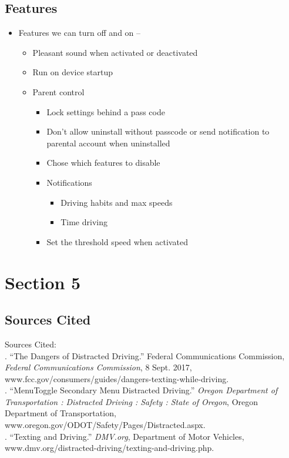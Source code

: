 \documentclass[12pt]{article}
\begin{document}
	\subsection{Features}
	\begin{itemize}
	\item Features we can turn off and on – 
		\begin{itemize}
			\item{Pleasant sound when activated or deactivated}
			\item{Run on device startup}
			\item{Parent control}
			\begin{itemize}
				\item{Lock settings behind a pass code}
				\item{Don’t allow uninstall without passcode or send notification to parental account when uninstalled}
				\item{Chose which features to disable}
				\item{Notifications}
				\begin{itemize}
					\item{Driving habits and max speeds}
					\item{Time driving}
				\end{itemize}
				\item{Set the threshold speed when activated}
			\end{itemize}
		\end{itemize}

\end{itemize}
\section{Section 5}
	\subsection{Sources Cited}

Sources Cited:\\
.	“The Dangers of Distracted Driving.” Federal Communications Commission,\textit{ Federal Communications Commission}, 8 Sept. 2017, www.fcc.gov/consumers/guides/dangers-texting-while-driving.\\
.	“MenuToggle Secondary Menu  Distracted Driving.” \textit{Oregon Department of Transportation : Distracted Driving : Safety : State of Oregon}, Oregon Department of Transportation, www.oregon.gov/ODOT/Safety/Pages/Distracted.aspx.\\
.	“Texting and Driving.” \textit{DMV.org}, Department of Motor Vehicles, www.dmv.org/distracted-driving/texting-and-driving.php.
\end{document}

